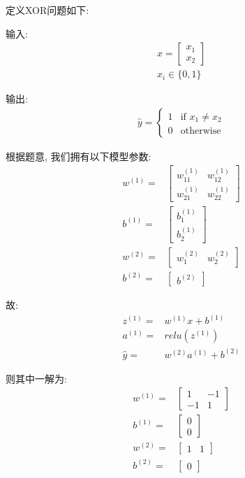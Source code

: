 \documentclass[]{subfiles}
\begin{document}
定义XOR问题如下:

输入:
\begin{align*}
x
= \left[
    \begin{array}{l}
        x_1 \\
        x_2
    \end{array}
\right] \\
x_i \in \{0, 1\}
\end{align*}

输出:
\begin{align*}
\hat{y}
= \left\{
    \begin{array}{ll}
        1 & \textrm{if $x_1 \ne x_2$} \\
        0 & \textrm{otherwise}
    \end{array}
\right.
\end{align*}

根据题意, 我们拥有以下模型参数:
\begin{align*}
w^{(1)}
= & \left[
    \begin{array}{cc}
        w^{(1)}_{11} & w^{(1)}_{12} \\
        w^{(1)}_{21} & w^{(1)}_{22}
    \end{array}
\right] \\
b^{(1)}
= & \left[
    \begin{array}{c}
        b^{(1)}_1 \\
        b^{(1)}_2
    \end{array}
\right] \\
w^{(2)}
= & \left[
    \begin{array}{cc}
        w^{(2)}_1 & w^{(2)}_2
    \end{array}
\right] \\
b^{(2)}
= & \left[
    \begin{array}{c}
        b^{(2)}
    \end{array}
\right]
\end{align*}

故:
\begin{align*}
z^{(1)} = & w^{(1)}x + b^{(1)} \\
a^{(1)} = & relu(z^{(1)}) \\
\hat{y} = & w^{(2)}a^{(1)} + b^{(2)}
\end{align*}

则其中一解为:
\begin{align*}
w^{(1)} = & \left[
    \begin{array}{cc}
        1 & -1 \\
        -1 & 1
    \end{array}
\right] \\
b^{(1)} = & \left[
    \begin{array}{c}
        0 \\
        0
    \end{array}
\right] \\
w^{(2)} = & \left[
    \begin{array}{cc}
        1 & 1
    \end{array}
\right] \\
b^{(2)} = & \left[
    \begin{array}{c}
        0
    \end{array}
\right]
\end{align*}
\end{document}
